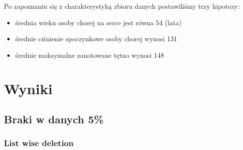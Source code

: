 \documentclass{classrep}
\begin{document}
{        Po zapoznaniu się z charakterystyką zbioru danych postawiliśmy trzy hipotezy:
        \begin{itemize}
            \item średnia wieku osoby chorej na serce jest równa 54 (lata)
            \item średnie ciśnienie spoczynkowe osoby chorej wynosi 131
            \item średnie maksymalne zanotowane tętno wynosi 148
        \end{itemize}
    }

    \section{Wyniki}
    \label{results} {

        \subsection{Braki w danych 5\%}
        \label{results:5-percent} {

            \subsubsection{List wise deletion}
            \label{results:5-percent:list-wise} {

}}}
\end{document}
